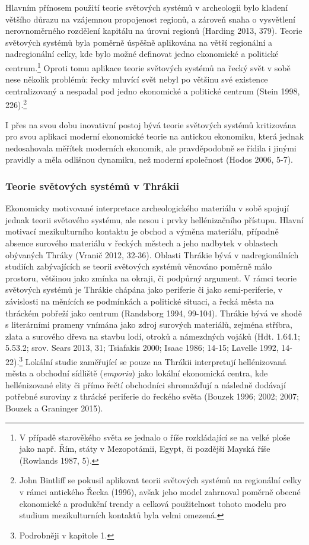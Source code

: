Hlavním přínosem použití teorie světových systémů v archeologii bylo kladení většího důrazu na vzájemnou propojenost regionů, a zároveň snaha o vysvětlení nerovnoměrného rozdělení kapitálu na úrovni regionů (Harding 2013, 379). Teorie světových systémů byla poměrně úspěšně aplikována na větší regionální a nadregionální celky, kde bylo možné definovat jedno ekonomické a politické centrum.\footnote{V případě starověkého světa se jednalo o říše rozkládající se na velké ploše jako např. Řím, státy v Mezopotámii, Egypt, či pozdější Mayská říše (Rowlands 1987, 5).} Oproti tomu aplikace teorie světových systémů na řecký svět v sobě nese několik problémů: řecky mluvící svět nebyl po většinu své existence centralizovaný a nespadal pod jedno ekonomické a politické centrum (Stein 1998, 226).\footnote{John Bintliff se pokusil aplikovat teorii světových systémů na regionální celky v rámci antického Řecka (1996), avšak jeho model zahrnoval poměrně obecné ekonomické a produkční trendy a celková použitelnost tohoto modelu pro studium mezikulturních kontaktů byla velmi omezená.}

I přes na svou dobu inovativní postoj bývá teorie světových systémů kritizována pro svou aplikaci moderní ekonomické teorie na antickou ekonomiku, která jednak nedosahovala měřítek moderních ekonomik, ale pravděpodobně se řídila i jinými pravidly a měla odlišnou dynamiku, než moderní společnost (Hodos 2006, 5-7).

\subsubsection[teorie-světových-systémů-v-thrákii]{Teorie světových systémů v Thrákii}

Ekonomicky motivované interpretace archeologického materiálu v sobě spojují jednak teorii světového systému, ale nesou i prvky hellénizačního přístupu. Hlavní motivací mezikulturního kontaktu je obchod a výměna materiálu, případně absence surového materiálu v řeckých městech a jeho nadbytek v oblastech obývaných Thráky (Vranič 2012, 32-36). Oblasti Thrákie bývá v nadregionálních studiích zabývajících se teorii světových systémů věnováno poměrně málo prostoru, většinou jako zmínka na okraji, či podpůrný argument. V rámci teorie světových systémů je Thrákie chápána jako periferie či jako semi-periferie, v závislosti na měnících se podmínkách a politické situaci, a řecká města na thráckém pobřeží jako centrum (Randsborg 1994, 99-104). Thrákie bývá ve shodě s literárními prameny vnímána jako zdroj surových materiálů, zejména stříbra, zlata a surového dřeva na stavbu lodí, otroků a námezdných vojáků (Hdt. 1.64.1; 5.53.2; srov. Sears 2013, 31; Tsiafakis 2000; Isaac 1986; 14-15; Lavelle 1992, 14-22).\footnote{Podrobněji v kapitole 1.} Lokální studie zaměřující se pouze na Thrákii interpretují hellénizovaná města a obchodní sídliště ({\em emporia}) jako lokální ekonomická centra, kde hellénizované elity či přímo řečtí obchodníci shromažďují a následně dodávají potřebné suroviny z thrácké periferie do řeckého světa (Bouzek 1996; 2002; 2007; Bouzek a Graninger 2015).

